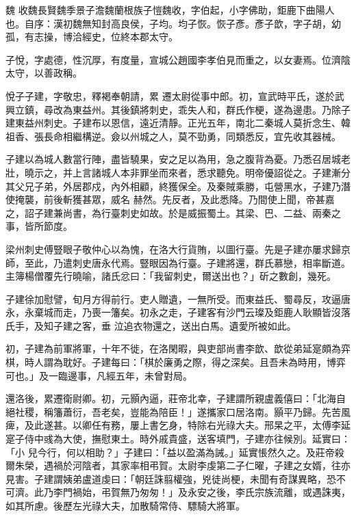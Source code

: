 
\begin{pinyinscope}

 魏
 收魏長賢魏季景子澹魏蘭根族子愷魏收，字伯起，小字佛助，鉅鹿下曲陽人也。自序：漢初魏無知封高良侯，子均。均子恢。恢子彥。彥子歆，字子胡，幼孤，有志操，博洽經史，位終本郡太守。



 子悅，字處德，性沉厚，有度量，宣城公趙國李孝伯見而重之，以女妻焉。位濟陰太守，以善政稱。



 悅子子建，字敬忠，釋褐奉朝請，累
 遷太尉從事中郎。初，宣武時平氏，遂於武興立鎮，尋改為東益州。其後鎮將刺史，乖失人和，群氏作梗，遂為邊患。乃除子建東益州刺史。子建布以恩信，遠近清靜。正光五年，南北二秦城人莫折念生、韓祖香、張長命相繼構逆。僉以州城之人，莫不勁勇，同類悉反，宜先收其器械。



 子建以為城人數當行陣，盡皆驍果，安之足以為用，急之腹背為憂。乃悉召居城老壯，曉示之，并上言諸城人本非罪坐而來者，悉求聽免。明帝優詔從之。子建漸分其父兄子弟，外居郡戍，內外相顧，終獲保全。及秦賊乘勝，屯營黑水，子建乃潛使掩襲，前後斬獲甚眾，威名
 赫然。先反者，及此悉降。乃間使上聞，帝甚嘉之，詔子建兼尚書，為行臺刺史如故。於是威振蜀土。其梁、巴、二益、兩秦之事，皆所節度。



 梁州刺史傅豎眼子敬仲心以為愧，在洛大行貨賄，以圖行臺。先是子建亦屢求歸京師，至此，乃遣刺史唐永代焉。豎眼因為行臺。子建將還，群氏慕戀，相率斷道。主簿楊僧覆先行曉喻，諸氏忿曰：「我留刺史，爾送出也？」斫之數創，幾死。



 子建徐加慰譬，旬月方得前行。吏人贈遺，一無所受。而東益氏、蜀尋反，攻逼唐永，永棄城而走，乃喪一籓矣。初永之走，子建客有沙門云璨及鉅鹿人耿顯皆沒落氏手，及知子建之客，垂
 泣追衣物還之，送出白馬。遺愛所被如此。



 初，子建為前軍將軍，十年不徙，在洛閑暇，與吏部尚書李歆、歆從弟延寔頗為弈棋，時人謂為耽好。子建每曰：「棋於廉勇之際，得之深矣。且吾未為時用，博弈可也。」及一臨邊事，凡經五年，未曾對局。



 還洛後，累遷衛尉卿。初，元顥內逼，莊帝北幸，子建謂所親盧義僖曰：「北海自絕社稷，稱籓蕭衍，吾老矣，豈能為陪臣！」遂攜家口居洛南。顥平乃歸。先苦風痺，及此遂甚。以卿任有務，屢上書乞身，特除右光祿大夫。邢杲之平，太傅李延寔子侍中彧為大使，撫慰東土。時外戚貴盛，送客填門，子建亦往候別。延實曰：「小
 兒今行，何以相助？」子建曰：「益以盈滿為誡。」延實悵然久之。及莊帝殺爾朱榮，遇禍於河陰者，其家率相弔賀。太尉李虔第二子仁曜，子建之女婿，往亦見害。子建謂姨弟盧道虔曰：「朝廷誅翦權強，兇徒尚梗，未聞有奇謀異略，恐不可濟。此乃李門禍始，弔賀無乃匆匆！」及永安之後，李氏宗族流離，或遇誅夷，如其所慮。後歷左光祿大夫，加散騎常侍、驃騎大將軍。




\end{pinyinscope}
